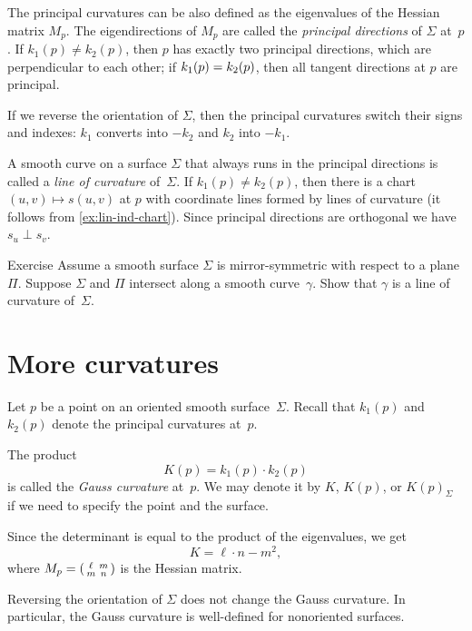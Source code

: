 The principal curvatures can be also defined as the eigenvalues of the Hessian matrix $M_p$.
The eigendirections of $M_p$ are called the {}\emph{principal directions} of $\Sigma$ at~$p$.
If $k_1(p)\ne k_2(p)$, then $p$ has exactly two principal directions, which are perpendicular to each other;
if $k_1(p)\z= k_2(p)$, then all tangent directions at $p$ are principal.

If we reverse the orientation of $\Sigma$, then the principal curvatures switch their signs and indexes: $k_1$ converts into $-k_2$ and $k_2$ into $-k_1$.

A smooth curve on a surface $\Sigma$ that always runs in the principal directions is called a \emph{line of curvature} of~$\Sigma$.
If $k_1(p)\ne k_2(p)$, then there is a chart $(u,v)\mapsto s(u,v)$ at $p$ with coordinate lines formed by lines of curvature (it follows from \ref{ex:lin-ind-chart}).
Since principal directions are orthogonal we have $s_u\perp s_v$.

\begin{thm}{Exercise}\label{ex:line-of-curvature}
Assume a smooth surface $\Sigma$ is mirror-symmetric with respect to a plane $\Pi$.
Suppose $\Sigma$ and $\Pi$ intersect along a smooth curve~$\gamma$.
Show that $\gamma$ is a line of curvature of~$\Sigma$.
\end{thm}

\section{More curvatures}\label{sec:More curvatures}

Let $p$ be a point on an oriented smooth surface~$\Sigma$.
Recall that $k_1(p)$ and $k_2(p)$ denote the principal curvatures at~$p$.

The product 
\[K(p)=k_1(p)\cdot k_2(p)\]
is called the \emph{Gauss curvature} at~$p$.
We may denote it by $K$, $K(p)$, or $K(p)_\Sigma$ if we need to specify the point and the surface.

Since the determinant is equal to the product of the eigenvalues, we get
\[K=\ell\cdot n-m^2,\]
where 
$M_p\z=
(\begin{smallmatrix}
\ell&m
\\
m&n
\end{smallmatrix}
)
$ is the Hessian matrix.

Reversing the orientation of $\Sigma$ does not change the Gauss curvature.
In particular, the Gauss curvature is well-defined for nonoriented surfaces.


